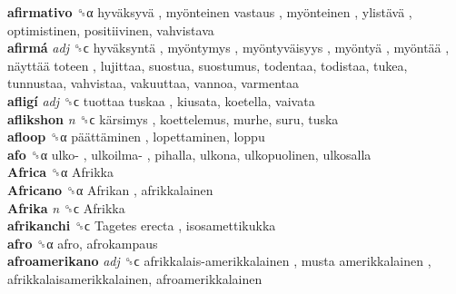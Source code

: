\textbf{afirmativo} ␝α   hyväksyvä ,  myönteinen vastaus ,  myönteinen ,  ylistävä , optimistinen, positiivinen, vahvistava  \\
\textbf{afirmá} \emph{adj}  ␝ϲ   hyväksyntä ,  myöntymys ,  myöntyväisyys ,  myöntyä ,  myöntää ,  näyttää toteen , lujittaa, suostua, suostumus, todentaa, todistaa, tukea, tunnustaa, vahvistaa, vakuuttaa, vannoa, varmentaa  \\
\textbf{afligí} \emph{adj}  ␝ϲ   tuottaa tuskaa , kiusata, koetella, vaivata  \\
\textbf{aflikshon} \emph{n}  ␝ϲ   kärsimys , koettelemus, murhe, suru, tuska  \\
\textbf{afloop} ␝α   päättäminen , lopettaminen, loppu  \\
\textbf{afo} ␝α   ulko- ,  ulkoilma- , pihalla, ulkona, ulkopuolinen, ulkosalla  \\
\textbf{Africa} ␝α   Afrikka   \\
\textbf{Africano} ␝α   Afrikan , afrikkalainen  \\
\textbf{Afrika} \emph{n}  ␝ϲ   Afrikka   \\
\textbf{afrikanchi} ␝ϲ   Tagetes erecta , isosamettikukka  \\
\textbf{afro} ␝α  afro, afrokampaus  \\
\textbf{afroamerikano} \emph{adj}  ␝ϲ   afrikkalais-amerikkalainen ,  musta amerikkalainen , afrikkalaisamerikkalainen, afroamerikkalainen  \\
